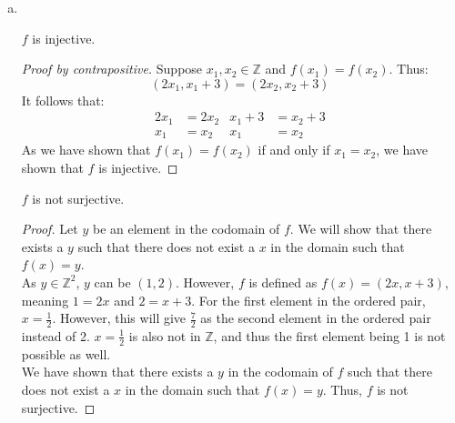 \documentclass[11pt]{scrartcl}
\theoremstyle{dotlessP}
\theoremstyle{dotlessN}
\DeclarePairedDelimiter\paren{(}{)} %
\newcommand{\ints}{\mathbb{Z}}
\begin{document}
\begin{enumerate}[(a)]
\begin{proof}
		\end{proof}
		As $f$ is injective and surjective, $f$ is bijective. We can find the inverse of $f$ :
		\begin{align*}
			y &= \paren*{\frac{x+1}{x-1}}^3 \\
			\intertext{Swap $x$ and $y$ to switch domain and range.}
			x &= \paren*{\frac{y+1}{y-1}}^3 \\
			\sqrt[3]{x} &= \paren*{\frac{y+1}{y-1}} \\
		(y-1)\sqrt[3]{x} &= y+1 \\
		y\sqrt[3]{x} - \sqrt[3]{x} &= y + 1 \\
		y\sqrt[3]{x} - y &= 1 + \sqrt[3]{x} \\
		y(\sqrt[3]{x} - 1) &= 1 + \sqrt[3]{x} \\
		y &= \frac{\sqrt[3]{x} + 1}{\sqrt[3]{x} - 1}
		\end{align*}
		Thus, the inverse function is $\displaystyle f^{-1}(x) = \frac{\sqrt[3]{x} + 1}{\sqrt[3]{x} - 1}$.
	\item \ 
		\begin{claim*}
			$f$ is injective.
		\end{claim*}
		\begin{proof}
			[Proof by contrapositive]
			Suppose $x_1, x_2 \in \ints$ and  $f(x_1) = f(x_2)$. Thus:
			\[
				(2x_1, x_1 + 3) = (2x_2, x_2 + 3)
			\]
			It follows that:
			\begin{align*}
				2x_1 &= 2x_2 & x_1 + 3 &= x_2 + 3 \\
				x_1 &= x_2 & x_1 &= x_2
			\end{align*}
			As we have shown that $f(x_1) = f(x_2)$ if and only if $x_1 = x_2$, we have shown that $f$ is injective.
		\end{proof}
		\begin{claim*}
			$f$ is not surjective.
		\end{claim*}
		\begin{proof}
			Let $y$ be an element in the codomain of $f$. We will show that there exists a $y$ such that there does not exist a $x$ in the domain such that $f(x) = y$. 
			\\

			As $y \in \ints^2$, $y$ can be $(1,2)$. However, $f$ is defined as $f(x) = (2x, x+3)$, meaning  $1 = 2x$ and $2 = x+3$. For the first element in the ordered pair, $x = \displaystyle\frac{1}{2}$. However, this will give  $\displaystyle\frac{7}{2}$ as the second element in the ordered pair instead of 2. $x = \displaystyle\frac{1}{2}$ is also not in $\ints$, and thus the first element being 1 is not possible as well.
			\\

			We have shown that there exists a $y$ in the codomain of $f$ such that there does not exist a $x$ in the domain such that $f(x) = y$. Thus,  $f$ is not surjective.
		\end{proof}
\end{enumerate}
\end{document}
